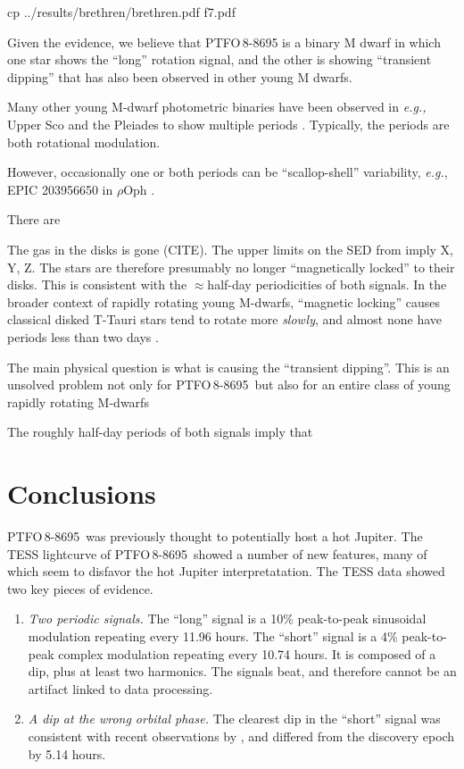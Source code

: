 \documentclass[12pt,twocolumn,tighten]{aastex62}
\newcommand{\ptfo}{PTFO$\,$8-8695}
\begin{document}
cp ../results/brethren/brethren.pdf f7.pdf

Given the evidence, we believe that PTFO$\,$8-8695 is a binary M dwarf
in which one star shows the ``long'' rotation signal, and the other is
showing ``transient dipping'' that has also been observed in other
young M dwarfs. 

Many other young M-dwarf photometric binaries
have been observed in {\it e.g.,} Upper Sco and the Pleiades to show
multiple periods \citep{rebull_usco_2018,stauffer_rotevol_2018}.
Typically, the periods are both rotational modulation.

However, occasionally one or both periods can be ``scallop-shell''
variability, {\it e.g.}, EPIC 203956650 in $\rho$Oph
\citep{rebull_usco_2018}.




There are 

The gas in the disks is gone (CITE).
The upper limits on the SED from \citet{yu_tests_2015} imply X, Y, Z.
The stars are therefore presumably no longer ``magnetically locked''
to their disks.
This is consistent with the $\approx$half-day periodicities of both
signals.
In the broader context of rapidly rotating young M-dwarfs, ``magnetic
locking'' causes classical disked T-Tauri stars tend to rotate more
{\it slowly}, and almost none have periods less than two days
\citep[{\it e.g.},][]{rebull_rotation_2020}.

The main physical question is what is causing the ``transient
dipping''. This is an unsolved problem not only for \ptfo\ but also
for an entire class of young rapidly rotating M-dwarfs



The roughly half-day periods of both signals imply that 






\section{Conclusions}
\label{sec:conclusions}

\ptfo\ was previously thought to potentially host a hot Jupiter.
The TESS lightcurve of \ptfo\ showed a number of new features,
many of which seem to disfavor the hot Jupiter interpretatation.
The TESS data showed two key pieces of evidence.
\begin{enumerate}
  \item {\it Two periodic signals.} The ``long'' signal is a 10\%
      peak-to-peak sinusoidal modulation repeating every 11.96 hours.
      The ``short'' signal is a 4\% peak-to-peak complex modulation
      repeating every 10.74 hours. It is composed of a dip, plus at
      least two harmonics. The signals beat, and therefore cannot be
      an artifact linked to data processing.
  \item {\it A dip at the wrong orbital phase.} The clearest dip in
    the ``short'' signal was consistent with recent observations by
    \citet{tanimoto_evidence_2020}, and differed from the discovery
    epoch by 5.14 hours.
\end{enumerate}
\end{document}
